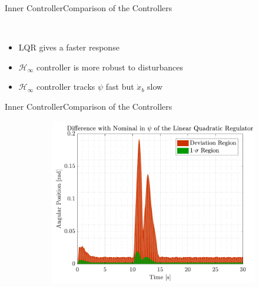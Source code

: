 \begin{frame}{Inner Controller}{Comparison of the Controllers}
\begin{figure}[H]
\begin{minipage}{0.45\linewidth}
\begin{figure}[H]
      \end{figure}                
    \end{minipage}\hfill \\
  \end{figure}
    \begin{itemize}
        \item LQR gives a faster response
        \item $\mathcal{H}_\infty$ controller is more robust to disturbances
        \item $\mathcal{H}_\infty$ controller tracks $\psi$ fast but $\dot{x}_b$ slow
    \end{itemize}
\end{frame}

\begin{frame}{Inner Controller}{Comparison of the Controllers}
  \begin{figure}[H]
    \begin{minipage}{0.45\linewidth}
      \begin{figure}[H]
        \centering
        \includegraphics[width=1\linewidth]{figures/yaw_mc_lqr_error}
      \end{figure}        
    \end{minipage}\hfill      
    \begin{minipage}{0.45\linewidth}
      \begin{figure}[H]
        \centering

\end{figure}
\end{minipage}
\end{figure}
\end{frame}
